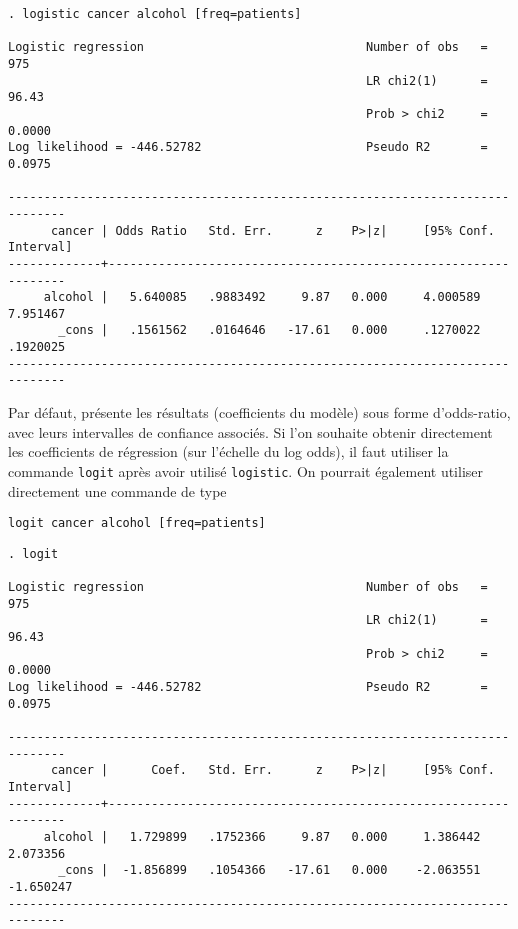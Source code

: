 \begin{verbatim}
. logistic cancer alcohol [freq=patients]

Logistic regression                               Number of obs   =        975
                                                  LR chi2(1)      =      96.43
                                                  Prob > chi2     =     0.0000
Log likelihood = -446.52782                       Pseudo R2       =     0.0975

------------------------------------------------------------------------------
      cancer | Odds Ratio   Std. Err.      z    P>|z|     [95% Conf. Interval]
-------------+----------------------------------------------------------------
     alcohol |   5.640085   .9883492     9.87   0.000     4.000589    7.951467
       _cons |   .1561562   .0164646   -17.61   0.000     .1270022    .1920025
------------------------------------------------------------------------------
\end{verbatim}

Par défaut, \Stata présente les résultats (coefficients du modèle) sous forme
d'odds-ratio, avec leurs intervalles de confiance associés. Si l'on souhaite
obtenir directement les coefficients de régression (sur l'échelle du log
odds), il faut utiliser la commande \texttt{logit} après avoir utilisé
\texttt{logistic}. On pourrait également utiliser directement une commande de
type 
\begin{verbatim}
logit cancer alcohol [freq=patients]
\end{verbatim}

\begin{verbatim}
. logit

Logistic regression                               Number of obs   =        975
                                                  LR chi2(1)      =      96.43
                                                  Prob > chi2     =     0.0000
Log likelihood = -446.52782                       Pseudo R2       =     0.0975

------------------------------------------------------------------------------
      cancer |      Coef.   Std. Err.      z    P>|z|     [95% Conf. Interval]
-------------+----------------------------------------------------------------
     alcohol |   1.729899   .1752366     9.87   0.000     1.386442    2.073356
       _cons |  -1.856899   .1054366   -17.61   0.000    -2.063551   -1.650247
------------------------------------------------------------------------------
\end{verbatim}
\label{stop:sol3stata}

